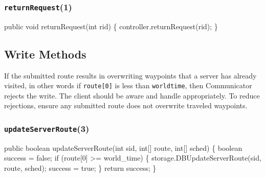 \documentclass{article}
\def\nwendcode{\endtrivlist \endgroup}      %
\let\nwdocspar=\par
\begin{document}
\subsubsection{{\tt{}\protect{}returnRequest}(1)}
\nwenddocs{}\endmoddef{}
public void returnRequest(int rid) \{
  controller.returnRequest(rid);
\}
\eatline
{}\nwendcode{}\nwdocspar
\subsection{Write Methods}
\label{sec:write-methods}

If the submitted route results in overwriting waypoints that a server has
already visited, in other words if {\tt{}route[0]} is less than {\tt{}\protect{}world{}time},
then Communicator rejects the write. The client should be aware and handle
appropriately. To reduce rejections, ensure any submitted route does not
overwrite traveled waypoints.

\subsubsection{{\tt{}\protect{}updateServerRoute}(3)}
\nwenddocs{}\endmoddef{}
public boolean updateServerRoute(int sid, int[] route, int[] sched) \{
  boolean success = false;
  if (route[0] >= world_time) \{
    storage.DBUpdateServerRoute(sid, route, sched);
    success = true;
  \}
  return success;
\}
\eatline
{}\nwendcode{}\nwdocspar
\end{document}
